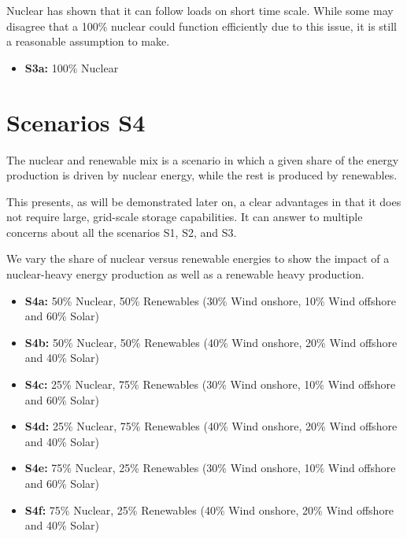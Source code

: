 Nuclear has shown that it can follow loads on short time scale. While some may disagree that a 100\% nuclear could function efficiently due to this issue, it is still a reasonable assumption to make.


\begin{kaobox}[frametitle=S3 scenarios]
\begin{itemize}
	\item \textbf{S3a:} 100\% Nuclear
\end{itemize}
\end{kaobox}


\section{Scenarios S4}

The nuclear and renewable mix is a scenario in which a given share of the energy production is driven by nuclear energy, while the rest is produced by renewables.

This presents, as will be demonstrated later on, a clear advantages in that it does not require large, grid-scale storage capabilities. It can answer to multiple concerns about all the scenarios S1, S2, and S3.

We vary the share of nuclear versus renewable energies to show the impact of a nuclear-heavy energy production as well as a renewable heavy production.


\begin{kaobox}[frametitle=S4 scenarios]
\begin{itemize}
	\item \textbf{S4a:} 50\% Nuclear, 50\% Renewables (30\% Wind onshore, 10\% Wind offshore and 60\% Solar)
	\item \textbf{S4b:} 50\% Nuclear, 50\% Renewables (40\% Wind onshore, 20\% Wind offshore and 40\% Solar)
	\item \textbf{S4c:} 25\% Nuclear, 75\% Renewables (30\% Wind onshore, 10\% Wind offshore and 60\% Solar)
	\item \textbf{S4d:} 25\% Nuclear, 75\% Renewables (40\% Wind onshore, 20\% Wind offshore and 40\% Solar)
	\item \textbf{S4e:} 75\% Nuclear, 25\% Renewables (30\% Wind onshore, 10\% Wind offshore and 60\% Solar)
	\item \textbf{S4f:} 75\% Nuclear, 25\% Renewables (40\% Wind onshore, 20\% Wind offshore and 40\% Solar)
\end{itemize}
\end{kaobox}





